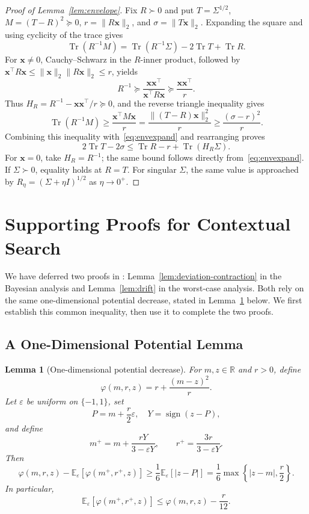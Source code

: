 \documentclass[11pt]{article}
\newtheorem{lemma}[theorem]{Lemma}
\newcommand{\Esub}[2]{\mathbb E_{#1}\left[#2\right]}
\newcommand{\R}{\mathbb R}
\DeclareMathOperator{\Tr}{Tr}
\newcommand{\norm}[1]{\lVert #1\rVert_2}
\newcommand{\bx}{\boldsymbol x}
\begin{document}
\begin{proof}[Proof of Lemma~\ref{lem:envelope}]
Fix $R\succ0$ and put $T=\Sigma^{1/2}$, $M=(T-R)^2\succeq0$, $r=\norm{R\bx}$, and $\sigma=\norm{T\bx}$. Expanding the square and using {cyclicity of the trace} gives
\begin{equation}\label{eq:envexpand}
 \Tr(R^{-1}M)=\Tr(R^{-1}\Sigma)-2\Tr T+\Tr R.
\end{equation}
For $\bx\ne0$, Cauchy--Schwarz in the $R$-inner product, followed by $\bx^\top R\bx\le\norm{\bx}\norm{R\bx}\le r$, yields
\[
 R^{-1}\succeq\frac{\bx\bx^\top}{\bx^\top R\bx}
 \succeq\frac{\bx\bx^\top}{r}.
\]
Thus $H_R=R^{-1}-\bx\bx^\top/r\succeq0$, and the reverse triangle inequality gives
\[
 \Tr(R^{-1}M)
 \ge\frac{\bx^\top M\bx}{r}
 =\frac{\norm{(T-R)\bx}^2}{r}
 \ge\frac{(\sigma-r)^2}{r}.
\]
{Combining this inequality with}~\eqref{eq:envexpand} and rearranging proves
\begin{equation}\label{eq:envelope}
 2\Tr T-2\sigma\le\Tr R-r+\Tr(H_R\Sigma).
\end{equation}
For $\bx=0$, take $H_R=R^{-1}$; the same bound follows directly from~\eqref{eq:envexpand}. If $\Sigma\succ0$, equality holds at $R=T$. For singular $\Sigma$, the same value is approached by $R_\eta=(\Sigma+\eta I)^{1/2}$ as $\eta\to 0^+$.
\end{proof}

\section{Supporting Proofs for Contextual Search}\label{app:proofs}

We have deferred two proofs in : Lemma~\ref{lem:deviation-contraction} in the Bayesian analysis and Lemma~\ref{lem:drift} in the worst-case analysis. Both rely on the same one-dimensional potential decrease, stated in Lemma~\ref{lem:scalar-potential} below. We first establish this common inequality, then use it to complete the two proofs.

\subsection{A One-Dimensional Potential Lemma}\label{app:scalar}

\begin{lemma}[One-dimensional potential decrease]\label{lem:scalar-potential}
For $m,z\in\R$ and $r>0$, define
\[
 \varphi(m,r,z)=r+\frac{(m-z)^2}{r}.
\]
Let $\varepsilon$ be uniform on $\{-1,1\}$, set
\[
 P=m+\frac r2\varepsilon,\quad
 Y=\operatorname{sign}(z-P),
\]
and define
\[
 m^+=m+\frac{rY}{3-\varepsilon Y},\qquad r^+=\frac{3r}{3-\varepsilon Y}.
\]
Then
\begin{equation}\label{eq:scalar-potential-drift}
 \varphi(m,r,z)-\Esub{\varepsilon}{\varphi(m^+,r^+,z)}
 \ge\frac16\Esub{\varepsilon}{|z-P|}
 =\frac16\max\left\{|z-m|,\frac r2\right\}.
\end{equation}
In particular,
\begin{equation}\label{eq:scalar-scale-decrease}
 \Esub{\varepsilon}{\varphi(m^+,r^+,z)}\le\varphi(m,r,z)-\frac r{12}.
\end{equation}
\end{lemma}
\end{document}
